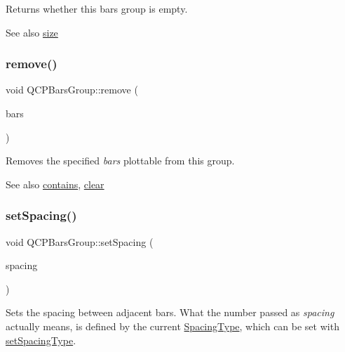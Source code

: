 Returns whether this bars group is empty.

\begin{DoxySeeAlso}{See also}
\hyperlink{class_q_c_p_bars_group_a3780ec77919cb00840207ec7a0f00dd5}{size} 
\end{DoxySeeAlso}
\mbox{\label{class_q_c_p_bars_group_a215e28a5944f1159013a0e19169220e7}} 
\subsubsection{\texorpdfstring{remove()}{remove()}}
{\footnotesize\ttfamily void Q\+C\+P\+Bars\+Group\+::remove (\begin{DoxyParamCaption}\item[{\hyperlink{class_q_c_p_bars}{Q\+C\+P\+Bars} $\ast$}]{bars }\end{DoxyParamCaption})}

Removes the specified {\itshape bars} plottable from this group.

\begin{DoxySeeAlso}{See also}
\hyperlink{class_q_c_p_bars_group_ae26da07a23553052a178fb3fae90d0dc}{contains}, \hyperlink{class_q_c_p_bars_group_a3ddf23928c6cd89530bd34ab7ba7b177}{clear} 
\end{DoxySeeAlso}
\mbox{\label{class_q_c_p_bars_group_aa553d327479d72a0c3dafcc724a190e2}} 
\subsubsection{\texorpdfstring{set\+Spacing()}{setSpacing()}}
{\footnotesize\ttfamily void Q\+C\+P\+Bars\+Group\+::set\+Spacing (\begin{DoxyParamCaption}\item[{double}]{spacing }\end{DoxyParamCaption})}

Sets the spacing between adjacent bars. What the number passed as {\itshape spacing} actually means, is defined by the current \hyperlink{class_q_c_p_bars_group_a4c0521120a97e60bbca37677a37075b6}{Spacing\+Type}, which can be set with \hyperlink{class_q_c_p_bars_group_a2c7e2d61b10594a4555b615e1fcaf49e}{set\+Spacing\+Type}.

